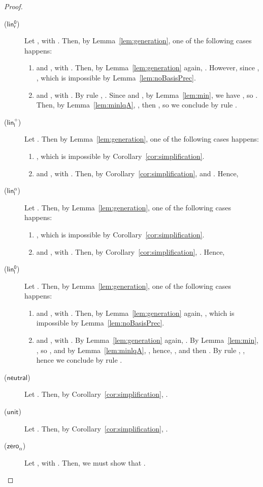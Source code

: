 \documentclass[preprint]{elsarticle}
\newcommand\s[1]{\ensuremath{\mathsf{#1}}}
\newcommand\rlinzr{(\s{lin^0_r})}
\newcommand\rlinl{(\s{lin^+_l})}
\newcommand\rlinscall{(\s{lin^\alpha_l})}
\newcommand\rlinzl{(\s{lin^0_l})}
\newcommand\rneut{(\s{neutral})}
\newcommand\runit{(\s{unit})}
\newcommand\rzeros{(\s{zero_\alpha})}
\begin{document}
\begin{proof}
\begin{description}
\begin{enumerate}
    \end{enumerate}
  \item[\rlinzr] Let , with . Then, by
    Lemma~\ref{lem:generation}, one of the following cases happens:
    \begin{enumerate}
    \item  and , with .
      Then, by Lemma~\ref{lem:generation} again, . However,
      since , , which is impossible by
      Lemma~\ref{lem:noBasisPrec}.
    \item  and , with
      . By rule , .
      Since  and , by
      Lemma~\ref{lem:min}, we have , so
      . Then, by Lemma~\ref{lem:minlqA}, , then , so we conclude by rule .
    \end{enumerate}
  \item[\rlinl] Let . Then by Lemma~\ref{lem:generation}, one
    of the following cases happens:
    \begin{enumerate}
    \item , which is impossible by
      Corollary~\ref{cor:simplification}.
    \item  and , with
      . Then, by Corollary~\ref{cor:simplification},  and . Hence,
      
    \end{enumerate}
  \item[\rlinscall] Let . Then, by
    Lemma~\ref{lem:generation}, one of the following cases happens:
    \begin{enumerate}
    \item , which is impossible by
      Corollary~\ref{cor:simplification}.
    \item  and , with
      . Then, by Corollary~\ref{cor:simplification}, . Hence,
      
    \end{enumerate}
  \item[\rlinzl] Let . Then, by
    Lemma~\ref{lem:generation}, one of the following cases happens:
    \begin{enumerate}
    \item  and , with
      . Then, by Lemma~\ref{lem:generation} again, , which is impossible by
      Lemma~\ref{lem:noBasisPrec}.
    \item  and ,
      with . By Lemma~\ref{lem:generation} again, .
      By Lemma~\ref{lem:min}, , so ,
      and by Lemma~\ref{lem:minlqA}, , hence, 
      , and then . By rule , , hence we
      conclude by rule .
    \end{enumerate}
  \item[\rneut] Let . Then, by
    Corollary~\ref{cor:simplification}, .
  \item[\runit] Let . Then, by Corollary~\ref{cor:simplification},
    .
  \item[\rzeros] Let , with . Then, we must show that .
    

\end{description}
\end{proof}
\end{document}
